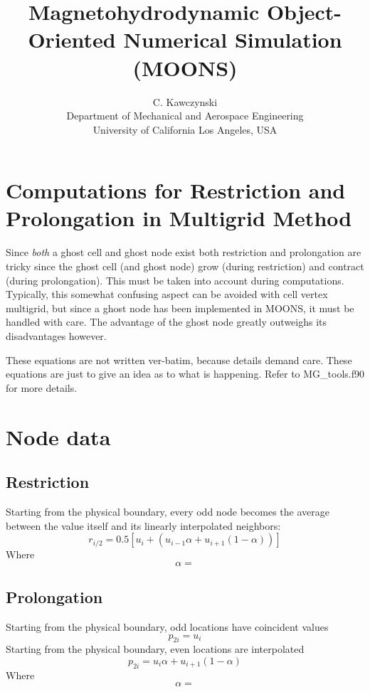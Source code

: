 \documentclass[11pt]{article}
\begin{document}
\doublespacing
\title{Magnetohydrodynamic Object-Oriented Numerical Simulation (MOONS)}
\author{C. Kawczynski \\
Department of Mechanical and Aerospace Engineering \\
University of California Los Angeles, USA\\
}
\maketitle

\section{Computations for Restriction and Prolongation in Multigrid Method}
Since \textit{both} a ghost cell and ghost node exist both restriction and prolongation are tricky since the ghost cell (and ghost node) grow (during restriction) and contract (during prolongation). This must be taken into account during computations. Typically, this somewhat confusing aspect can be avoided with cell vertex multigrid, but since a ghost node has been implemented in MOONS, it must be handled with care. The advantage of the ghost node greatly outweighs its disadvantages however.

These equations are not written ver-batim, because details demand care. These equations are just to give an idea as to what is happening. Refer to MG_tools.f90 for more details.

\section{Node data}

\subsection{Restriction}
Starting from the physical boundary, every odd node becomes the average between the value itself and its linearly interpolated neighbors:
\begin{equation}
	r_{i/2} = 0.5 \left[ u_i + (u_{i-1}\alpha + u_{i+1}(1-\alpha)) \right]
\end{equation}
Where
\begin{equation}
	\alpha = 
\end{equation}

\subsection{Prolongation}
Starting from the physical boundary, odd locations have coincident values
\begin{equation}
	p_{2i} = u_{i}
\end{equation}
Starting from the physical boundary, even locations are interpolated
\begin{equation}
	p_{2i} = u_{i}\alpha + u_{i+1}(1 - \alpha)
\end{equation}
Where
\begin{equation}
	\alpha = 
\end{equation}
\end{document}
